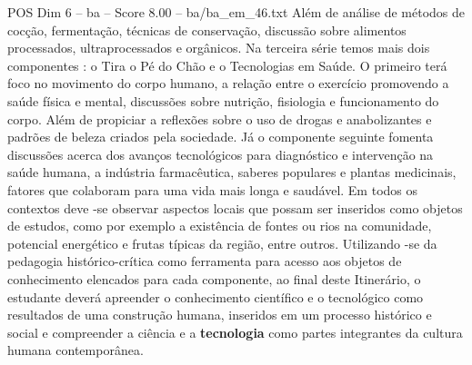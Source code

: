 \begin{textsample}{POS Dim 6 – ba – Score 8.00 – ba/ba\_em\_46.txt}
Além de análise de métodos de cocção, fermentação, técnicas de conservação, discussão sobre alimentos processados, ultraprocessados e orgânicos.
Na terceira série temos mais dois componentes : o Tira o Pé do Chão e o Tecnologias em Saúde.
O primeiro terá foco no movimento do corpo humano, a relação entre o exercício promovendo a saúde física e mental, discussões sobre nutrição, fisiologia e funcionamento do corpo.
Além de propiciar a reflexões sobre o uso de drogas e anabolizantes e padrões de beleza criados pela sociedade.
Já o componente seguinte fomenta discussões acerca dos avanços tecnológicos para diagnóstico e intervenção na saúde humana, a indústria farmacêutica, saberes populares e plantas medicinais, fatores que colaboram para uma vida mais longa e saudável.
Em todos os contextos deve -se observar aspectos locais que possam ser inseridos como objetos de estudos, como por exemplo a existência de fontes ou rios na comunidade, potencial energético e frutas típicas da região, entre outros.
Utilizando -se da pedagogia histórico-crítica como ferramenta para acesso aos objetos de conhecimento elencados para cada componente, ao final deste Itinerário, o estudante deverá apreender o conhecimento científico e o tecnológico como resultados de uma construção humana, inseridos em um processo histórico e social e compreender a ciência e a \textbf{tecnologia} como partes integrantes da cultura humana contemporânea.

\end{textsample}
